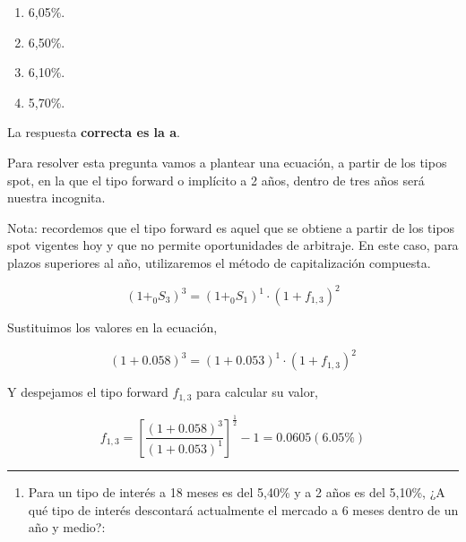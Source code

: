 \documentclass[
  letterpaper,
  DIV=11,
  numbers=noendperiod]{scrreprt}
\providecommand{\tightlist}{%
  \setlength{\itemsep}{0pt}\setlength{\parskip}{0pt}}\usepackage{longtable,booktabs,array}
\begin{document}
\begin{enumerate}
\def\labelenumi{\alph{enumi}.}
\item
  6,05\%.
\item
  6,50\%.
\item
  6,10\%.
\item
  5,70\%.
\end{enumerate}

\begin{tcolorbox}[enhanced jigsaw, left=2mm, opacityback=0, colback=white, breakable, arc=.35mm, bottomrule=.15mm, rightrule=.15mm, toprule=.15mm, leftrule=.75mm, colframe=quarto-callout-tip-color-frame]
\begin{minipage}[t]{5.5mm}
\textcolor{quarto-callout-tip-color}{\faLightbulb}
\end{minipage}%
\begin{minipage}[t]{\textwidth - 5.5mm}

La respuesta \textbf{correcta es la a}.

Para resolver esta pregunta vamos a plantear una ecuación, a partir de
los tipos spot, en la que el tipo forward o implícito a 2 años, dentro
de tres años será nuestra incognita.

Nota: recordemos que el tipo forward es aquel que se obtiene a partir de
los tipos spot vigentes hoy y que no permite oportunidades de arbitraje.
En este caso, para plazos superiores al año, utilizaremos el método de
capitalización compuesta.

\[\left(1+_0S_3\right)^3=\left(1+_{0}S_1\right)^1\cdot\left(1+f_{1,3}\right)^2\]

Sustituimos los valores en la ecuación,

\[\left(1+0.058\right)^3=\left(1+0.053\right)^1\cdot\left(1+f_{1,3}\right)^2\]

Y despejamos el tipo forward \(f_{1,3}\) para calcular su valor,

\[f_{1,3}=\left[\frac{\left(1+0.058\right)^3}{ \left(1+0.053\right)^1}\right]^{\frac{1}{2}}-1=0.0605(6.05\%)\]

\end{minipage}%
\end{tcolorbox}

\begin{center}\rule{0.5\linewidth}{0.5pt}\end{center}

\begin{enumerate}
\def\labelenumi{\arabic{enumi}.}
\setcounter{enumi}{39}
\tightlist
\item
  Para un tipo de interés a 18 meses es del 5,40\% y a 2 años es del
  5,10\%, ¿A qué tipo de interés descontará actualmente el mercado a 6
  meses dentro de un año y medio?:
\end{enumerate}
\end{document}
